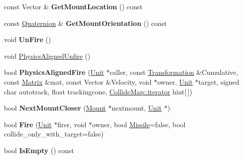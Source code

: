 \begin{DoxyCompactItemize}
\item 
const Vector \& {\bfseries Get\+Mount\+Location} () const \hypertarget{classMount_aaf28415cee9f91b45239592a99e9351d}{}\label{classMount_aaf28415cee9f91b45239592a99e9351d}

\item 
const \hyperlink{structQuaternion}{Quaternion} \& {\bfseries Get\+Mount\+Orientation} () const \hypertarget{classMount_afc0a0af268fe6ad42a89046685b8e794}{}\label{classMount_afc0a0af268fe6ad42a89046685b8e794}

\item 
void {\bfseries Un\+Fire} ()\hypertarget{classMount_a7a84cc512796fddaac1b75a6042be61f}{}\label{classMount_a7a84cc512796fddaac1b75a6042be61f}

\item 
void \hyperlink{classMount_a55fd3c8e4edb651a2c5196f418a997aa}{Physics\+Aligned\+Unfire} ()
\item 
bool {\bfseries Physics\+Aligned\+Fire} (\hyperlink{classUnit}{Unit} $\ast$caller, const \hyperlink{structTransformation}{Transformation} \&Cumulative, const \hyperlink{classMatrix}{Matrix} \&mat, const Vector \&Velocity, void $\ast$owner, \hyperlink{classUnit}{Unit} $\ast$target, signed char autotrack, float trackingcone, \hyperlink{classCollidable}{Collide\+Map\+::iterator} hint\mbox{[}$\,$\mbox{]})\hypertarget{classMount_a65fe7de3587b10747310b94636975919}{}\label{classMount_a65fe7de3587b10747310b94636975919}

\item 
bool {\bfseries Next\+Mount\+Closer} (\hyperlink{classMount}{Mount} $\ast$nextmount, \hyperlink{classUnit}{Unit} $\ast$)\hypertarget{classMount_a86ba36a44f9ef5b572174b1face8e89f}{}\label{classMount_a86ba36a44f9ef5b572174b1face8e89f}

\item 
bool {\bfseries Fire} (\hyperlink{classUnit}{Unit} $\ast$firer, void $\ast$owner, bool \hyperlink{classMissile}{Missile}=false, bool collide\+\_\+only\+\_\+with\+\_\+target=false)\hypertarget{classMount_a2b9057f1f0199464388f6126b060e8e0}{}\label{classMount_a2b9057f1f0199464388f6126b060e8e0}

\item 
bool {\bfseries Is\+Empty} () const \hypertarget{classMount_ad1ee281e3ad579ee03e97f90db9e9324}{}\label{classMount_ad1ee281e3ad579ee03e97f90db9e9324}

\end{DoxyCompactItemize}
